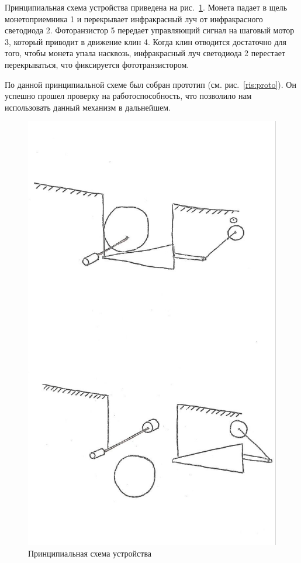 Принципиальная схема устройства приведена на рис.~\ref{ris:scheme_idea}. Монета падает в щель монетоприемника 1 и перекрывает инфракрасный луч от инфракрасного светодиода 2. Фоторанзистор 5 передает управляющий сигнал на шаговый мотор 3, который приводит в движение клин 4. Когда клин отводится достаточно для того, чтобы монета упала насквозь, инфракрасный луч светодиода 2 перестает перекрываться, что фиксируется фототранзистором. 



По данной принципиальной схеме был собран прототип (см. рис.~\ref{ris:proto}). Он успешно прошел проверку на работоспособность, что позволило нам использовать данный механизм в дальнейшем.

\begin{figure}[H]
	\centering
	\includegraphics[width=12cm]{scheme_idea.jpg}
	\caption{Принципиальная схема устройства}
	\label{ris:scheme_idea}
\end{figure}
\par\medskip

